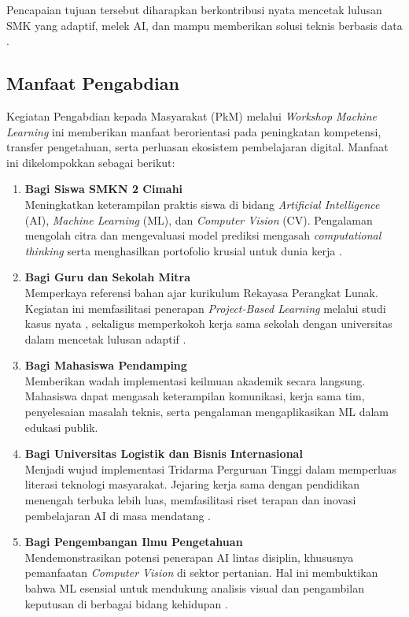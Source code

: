 Pencapaian tujuan tersebut diharapkan berkontribusi nyata mencetak lulusan SMK yang adaptif, melek AI, dan mampu memberikan solusi teknis berbasis data \parencite{Andriani2025}.

\subsection{Manfaat Pengabdian}

Kegiatan Pengabdian kepada Masyarakat (PkM) melalui \textit{Workshop Machine Learning} ini memberikan manfaat berorientasi pada peningkatan kompetensi, transfer pengetahuan, serta perluasan ekosistem pembelajaran digital. Manfaat ini dikelompokkan sebagai berikut:

\begin{enumerate}
    \item \textbf{Bagi Siswa SMKN 2 Cimahi}\\
    Meningkatkan keterampilan praktis siswa di bidang \textit{Artificial Intelligence} (AI), \textit{Machine Learning} (ML), dan \textit{Computer Vision} (CV). Pengalaman mengolah citra dan mengevaluasi model prediksi mengasah \textit{computational thinking} serta menghasilkan portofolio krusial untuk dunia kerja \parencite{Utomo2024, Hidayat2026}.

    \item \textbf{Bagi Guru dan Sekolah Mitra}\\
    Memperkaya referensi bahan ajar kurikulum Rekayasa Perangkat Lunak. Kegiatan ini memfasilitasi penerapan \textit{Project-Based Learning} melalui studi kasus nyata \parencite{PANE2025, Wahyudi2024}, sekaligus memperkokoh kerja sama sekolah dengan universitas dalam mencetak lulusan adaptif \parencite{Nirawana2026}.

    \item \textbf{Bagi Mahasiswa Pendamping}\\
    Memberikan wadah implementasi keilmuan akademik secara langsung. Mahasiswa dapat mengasah keterampilan komunikasi, kerja sama tim, penyelesaian masalah teknis, serta pengalaman mengaplikasikan ML dalam edukasi publik.

    \item \textbf{Bagi Universitas Logistik dan Bisnis Internasional}\\
    Menjadi wujud implementasi Tridarma Perguruan Tinggi dalam memperluas literasi teknologi masyarakat. Jejaring kerja sama dengan pendidikan menengah terbuka lebih luas, memfasilitasi riset terapan dan inovasi pembelajaran AI di masa mendatang \parencite{Ali2025}.

    \item \textbf{Bagi Pengembangan Ilmu Pengetahuan}\\
    Mendemonstrasikan potensi penerapan AI lintas disiplin, khususnya pemanfaatan \textit{Computer Vision} di sektor pertanian. Hal ini membuktikan bahwa ML esensial untuk mendukung analisis visual dan pengambilan keputusan di berbagai bidang kehidupan \parencite{Imanulloh2023, MarwanRamdhanyEdy2025}.
\end{enumerate}

